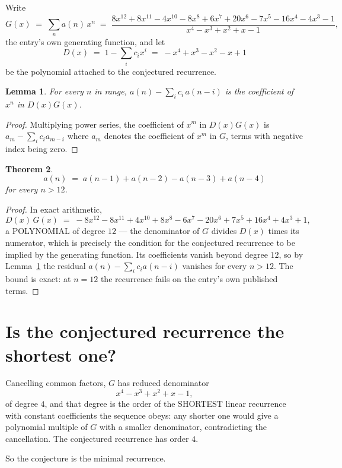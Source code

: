 \documentclass[11pt,a4paper]{article}
\theoremstyle{plain}
\newtheorem{theorem}{Theorem}
\newtheorem{lemma}[theorem]{Lemma}
\theoremstyle{definition}
\begin{document}
Write
\[
G(x)\;=\;\sum_{n}a(n)\,x^{n}\;=\;\frac{8 x^{12} + 8 x^{11} - 4 x^{10} - 8 x^{8} + 6 x^{7} + 20 x^{6} - 7 x^{5} - 16 x^{4} - 4 x^{3} - 1}{x^{4} - x^{3} + x^{2} + x - 1},
\]
the entry's own generating function, and let
\[
D(x)\;=\;1-\sum_i c_i x^{i}\;=\;- x^{4} + x^{3} - x^{2} - x + 1
\]
be the polynomial attached to the conjectured recurrence.

\begin{lemma}\label{lem:key}
For every $n$ in range, $a(n)-\sum_i c_i\,a(n-i)$ is the coefficient of $x^{n}$ in
$D(x)G(x)$.
\end{lemma}

\begin{proof}
Multiplying power series, the coefficient of $x^{m}$ in $D(x)G(x)$ is
$a_m-\sum_i c_i a_{m-i}$ where $a_m$ denotes the coefficient of $x^{m}$ in $G$, terms with
negative index being zero.
\end{proof}

\begin{theorem}
\[
a(n)\;=\;a(n-1) + a(n-2) - a(n-3) + a(n-4)
\]
for every $n>12$.
\end{theorem}

\begin{proof}
In exact arithmetic,
\[
D(x)\,G(x)\;=\;- 8 x^{12} - 8 x^{11} + 4 x^{10} + 8 x^{8} - 6 x^{7} - 20 x^{6} + 7 x^{5} + 16 x^{4} + 4 x^{3} + 1,
\]
a POLYNOMIAL of degree $12$ --- the denominator of $G$ divides $D(x)$ times its numerator,
which is precisely the condition for the conjectured recurrence to be implied by the
generating function. Its coefficients vanish beyond degree $12$, so by
Lemma~\ref{lem:key} the residual $a(n)-\sum_ic_ia(n-i)$ vanishes for every
$n>12$. The bound is exact: at $n=12$ the recurrence fails on the entry's own published terms.
\end{proof}

\section{Is the conjectured recurrence the shortest one?}

Cancelling common factors, $G$ has reduced denominator
\[
x^{4} - x^{3} + x^{2} + x - 1,
\]
of degree $4$, and that degree is the order of the SHORTEST linear recurrence with
constant coefficients the sequence obeys: any shorter one would give a polynomial multiple of
$G$ with a smaller denominator, contradicting the cancellation. The conjectured recurrence has
order $4$.

So the conjecture is the minimal recurrence.
\end{document}
